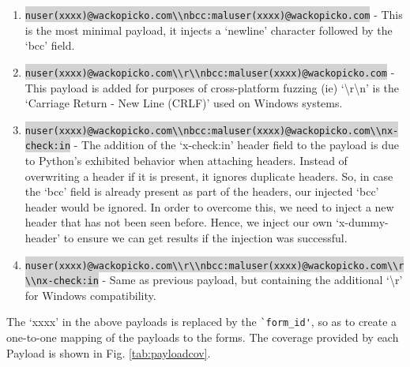 		\begin{enumerate}
			\item
			 \colorbox{lightgray}{\lstinline{nuser(xxxx)@wackopicko.com\\nbcc:maluser(xxxx)@wackopicko.com}} - This is the most minimal payload, it injects a `newline' character followed by the `bcc' field.
			\item \colorbox{lightgray}{\lstinline{nuser(xxxx)@wackopicko.com\\r\\nbcc:maluser(xxxx)@wackopicko.com}} - This payload is added for purposes of cross-platform fuzzing (ie) `\textbackslash{}r\textbackslash{}n' is the `Carriage Return - New Line (CRLF)' used on Windows systems. 
			\item \colorbox{lightgray}{\lstinline{nuser(xxxx)@wackopicko.com\\nbcc:maluser(xxxx)@wackopicko.com\\nx-check:in}} - The addition of the `x-check:in' header field to the payload is due to Python's exhibited behavior when attaching
			headers. Instead of overwriting a header if it is present, it ignores duplicate headers. So, in case the `bcc' field is already present as part of the headers, our injected `bcc' header would be ignored. In order to overcome this, we need to inject a new header that has not been seen before. Hence, we inject our own `x-dummy-header' to ensure we can get results if the injection was successful.
			\item \colorbox{lightgray}{\lstinline{nuser(xxxx)@wackopicko.com\\r\\nbcc:maluser(xxxx)@wackopicko.com\\r\\nx-check:in}} - Same as previous payload, but containing the additional `\textbackslash{}r' for Windows compatibility.
			 
		\end{enumerate}
		The `xxxx' in the above payloads is replaced by the \lstinline{`form_id'}, so as to create a one-to-one mapping of the payloads to the forms. The coverage provided by each Payload is shown in Fig. \ref{tab:payloadcov}.\\

